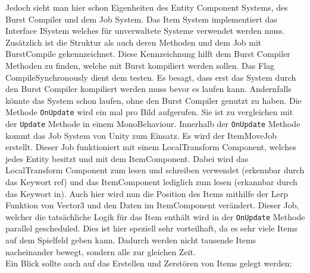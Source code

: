 Jedoch sieht man hier schon Eigenheiten des Entity Component Systems, des Burst Compiler und dem Job System. Das Item System implementiert das Interface ISystem welches für unverwaltete Systeme verwendet werden muss. Zusätzlich ist die Struktur als auch deren Methoden und dem Job mit BurstCompile gekennzeichnet. Diese Kennzeichnung hilft dem Burst Compiler Methoden zu finden, welche mit Burst kompiliert werden sollen. Das Flag CompileSynchronously dient dem testen. Es besagt, dass erst das System durch den Burst Compiler kompiliert werden muss bevor es laufen kann. Andernfalls könnte das System schon laufen, ohne den Burst Compiler genutzt zu haben. Die Methode \texttt{OnUpdate} wird ein mal pro Bild aufgerufen. Sie ist zu vergleichen mit der \texttt{Update} Methode in einem MonoBehaviour. Innerhalb der \texttt{OnUpdate} Methode kommt das Job System von Unity zum Einsatz. Es wird der ItemMoveJob erstellt. Dieser Job funktioniert mit einem LocalTransform Component, welches jedes Entity besitzt und mit dem ItemComponent. Dabei wird das LocalTransform Component zum lesen und schreiben verwendet (erkennbar durch das Keywort ref) und das ItemComponent lediglich zum lesen (erkannbar durch das Keywort in). Auch hier wird nun die Position des Items mithilfe der Lerp Funktion von Vector3 und den Daten im ItemComponent verändert. Dieser Job, welcher die tatsächliche Logik für das Item enthält wird in der \texttt{OnUpdate} Methode parallel gescheduled. Dies ist hier speziell sehr vorteilhaft, da es sehr viele Items auf dem Spielfeld geben kann. Dadurch werden nicht tausende Items nacheinander bewegt, sondern alle zur gleichen Zeit.\\Ein Blick sollte auch auf das Erstellen und Zerstören von Items gelegt werden:
